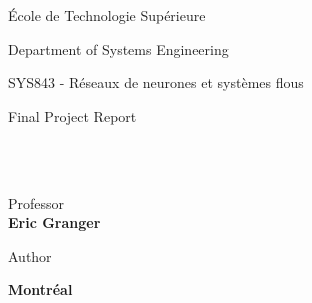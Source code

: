 \begin{center}
{\LARGE
École de Technologie Supérieure}

Department of Systems Engineering

SYS843 - Réseaux de neurones et systèmes flous

Final Project Report
\end{center}

\vspace*{\fill}

\begin{center}
    \singlespacing \Large \textbf{\\\thetitle \\}
\end{center}

\begin{center}
	\vspace{1cm}
	\normalsize	
	Professor \\
	\large
	\textbf{Eric Granger}
	
	\vspace{1cm}
	\normalsize	
	Author \\
	\large
	\textbf{\theauthor}
\end{center}

\vspace*{\fill}

\begin{center}
    \textbf{Montréal\\
    \thedate}
\end{center}

\thispagestyle{empty} %

\newpage

